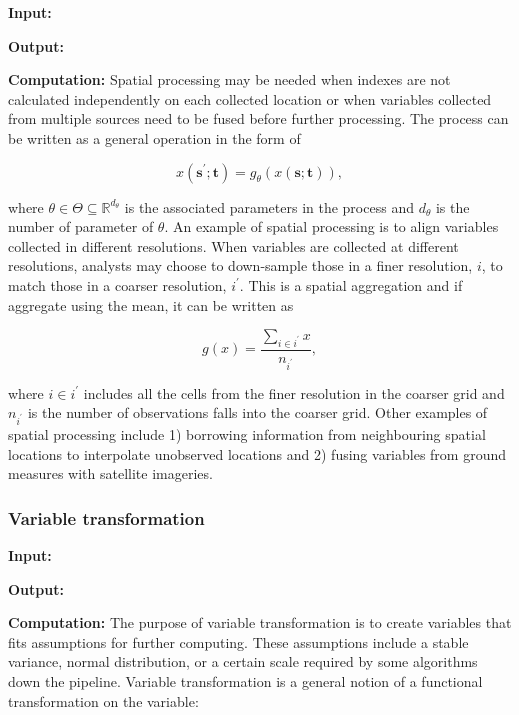 \documentclass[
]{interact}
\begin{document}
\textbf{Input: }

\textbf{Output: }

\textbf{Computation:} Spatial processing may be needed when indexes are
not calculated independently on each collected location or when
variables collected from multiple sources need to be fused before
further processing. The process can be written as a general operation in
the form of

\begin{equation}
x(\mathbf{s}^\prime;\mathbf{t}) = g_{\mathcal{\theta}}(x(\mathbf{s};\mathbf{t})),
\end{equation}

where \(\theta \in \Theta \subseteq \mathbb{R}^{d_{\theta}}\) is the
associated parameters in the process and \(d_{\theta}\) is the number of
parameter of \(\theta\). An example of spatial processing is to align
variables collected in different resolutions. When variables are
collected at different resolutions, analysts may choose to down-sample
those in a finer resolution, \(i\), to match those in a coarser
resolution, \(i^\prime\). This is a spatial aggregation and if aggregate
using the mean, it can be written as

\begin{equation}
g(x) = \frac{\sum_{i \in i^\prime}x}{n_{i^\prime}},
\end{equation}

where \(i \in i^\prime\) includes all the cells from the finer
resolution in the coarser grid and \(n_{i^\prime}\) is the number of
observations falls into the coarser grid. Other examples of spatial
processing include 1) borrowing information from neighbouring spatial
locations to interpolate unobserved locations and 2) fusing variables
from ground measures with satellite imageries.

\hypertarget{variable-transformation}{%
\subsubsection{Variable transformation}\label{variable-transformation}}

\textbf{Input: }

\textbf{Output: }

\textbf{Computation:} The purpose of variable transformation is to
create variables that fits assumptions for further computing. These
assumptions include a stable variance, normal distribution, or a certain
scale required by some algorithms down the pipeline. Variable
transformation is a general notion of a functional transformation on the
variable:
\end{document}
